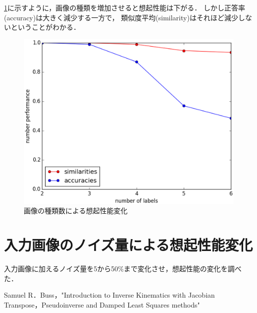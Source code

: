 \documentclass[10pt,twocolumn]{jarticle}
\newcommand{\figref}[1]{\figurename\ref{fig:#1}}
\begin{document}
\figref{labels-performance}に示すように，画像の種類を増加させると想起性能は下がる．
しかし正答率(accuracy)は大きく減少する一方で，
類似度平均(similarity)はそれほど減少しないということがわかる．
\begin{figure}[htpb]
  \centering
    \includegraphics[width=\columnwidth]{figs/labels_performance}
    \caption{画像の種類数による想起性能変化}
    \label{fig:labels-performance}
\end{figure}


\section{入力画像のノイズ量による想起性能変化}
入力画像に加えるノイズ量を5から50\%まで変化させ，想起性能の変化を調べた．


\begin{thebibliography}{9}
   Samuel R．Buss，"Introduction to Inverse Kinematics with Jacobian Transpose，Pseudoinverse and Damped Least Squares methods"
\end{thebibliography}
\end{document}
